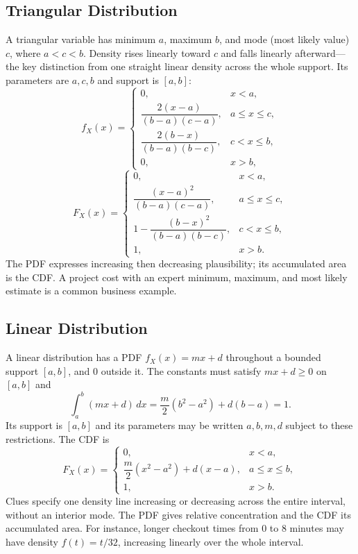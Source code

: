 
	\subsection{Triangular Distribution}
	\label{sec:introduction-triangular}
	A triangular variable has minimum $a$, maximum $b$, and mode (most likely value) $c$, where $a<c<b$. Density rises linearly toward $c$ and falls linearly afterward---the key distinction from one straight linear density across the whole support. Its parameters are $a,c,b$ and support is $[a,b]$:
	\[
	 f_X(x)=\begin{cases}
	 0,&x<a,\\
	 \dfrac{2(x-a)}{(b-a)(c-a)},&a\le x\le c,\\
	 \dfrac{2(b-x)}{(b-a)(b-c)},&c<x\le b,\\
	 0,&x>b,
	 \end{cases}
	\]
	\[
	 F_X(x)=\begin{cases}
	 0,&x<a,\\
	 \dfrac{(x-a)^2}{(b-a)(c-a)},&a\le x\le c,\\
	 1-\dfrac{(b-x)^2}{(b-a)(b-c)},&c<x\le b,\\
	 1,&x>b.
	 \end{cases}
	\]
	The PDF expresses increasing then decreasing plausibility; its accumulated area is the CDF. A project cost with an expert minimum, maximum, and most likely estimate is a common business example.


	\subsection{Linear Distribution}
	\label{sec:introduction-linear}
	A linear distribution has a PDF $f_X(x)=mx+d$ throughout a bounded support $[a,b]$, and $0$ outside it. The constants must satisfy $mx+d\ge0$ on $[a,b]$ and
	\[
		\int_a^b(mx+d)\,dx=\frac{m}{2}(b^2-a^2)+d(b-a)=1.
	\]
	Its support is $[a,b]$ and its parameters may be written $a,b,m,d$ subject to these restrictions. The CDF is
	\[
	 F_X(x)=\begin{cases}0,&x<a,\\\dfrac{m}{2}(x^2-a^2)+d(x-a),&a\le x\le b,\\1,&x>b.\end{cases}
	\]
	Clues specify one density line increasing or decreasing across the entire interval, without an interior mode. The PDF gives relative concentration and the CDF its accumulated area. For instance, longer checkout times from 0 to 8 minutes may have density $f(t)=t/32$, increasing linearly over the whole interval.

